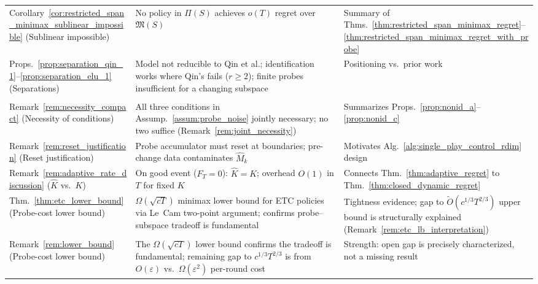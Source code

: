\documentclass{article}
\begin{document}
{\begin{longtable}{
  >{\raggedright\arraybackslash}p{}
  >{\raggedright\arraybackslash}p{}
  >{\raggedright\arraybackslash}p{}
}
Corollary~\ref{cor:restricted_span_minimax_sublinear_impossible} \newline (Sublinear impossible) &
  No policy in $\Pi(S)$ achieves $o(T)$ regret over $\mathfrak M(S)$ &
  Summary of Thms.~\ref{thm:restricted_span_minimax_regret}--\ref{thm:restricted_span_minimax_regret_with_probe} \\

Props.~\ref{prop:separation_qin_1}--\ref{prop:separation_elu_1} \newline (Separations) &
  Model not reducible to Qin et al.; identification works where Qin's fails ($r\!\ge\!2$); finite probes insufficient for a changing subspace &
  Positioning vs.\ prior work \\

\midrule
\multicolumn{3}{l}{\textit{\textbf{Key remarks} --- interpretive context}} \\
\midrule

Remark~\ref{rem:necessity_compact} \newline (Necessity of conditions) &
  All three conditions in Assump.~\ref{assum:probe_noise} jointly necessary; no two suffice (Remark~\ref{rem:joint_necessity}) &
  Summarizes Props.~\ref{prop:nonid_a}--\ref{prop:nonid_c} \\

Remark~\ref{rem:reset_justification} \newline (Reset justification) &
  Probe accumulator must reset at boundaries; pre-change data contaminates $\widehat M_k$ &
  Motivates Alg.~\ref{alg:single_play_control_rdim} design \\

Remark~\ref{rem:adaptive_rate_discussion} \newline ($\hat K$ vs.\ $K$) &
  On good event ($F_T\!=\!0$): $\hat K\!=\!K$; overhead $O(1)$ in $T$ for fixed $K$ &
  Connects Thm.~\ref{thm:adaptive_regret} to Thm.~\ref{thm:closed_dynamic_regret} \\

Thm.~\ref{thm:etc_lower_bound} \newline (Probe-cost lower bound) &
  $\Omega(\sqrt{cT})$ minimax lower bound for ETC policies via Le~Cam two-point argument; confirms probe--subspace tradeoff is fundamental &
  Tightness evidence; gap to $\widetilde O(c^{1/3}T^{2/3})$ upper bound is structurally explained (Remark~\ref{rem:etc_lb_interpretation}) \\

Remark~\ref{rem:lower_bound} \newline (Probe-cost lower bound) &
  The $\Omega(\sqrt{cT})$ lower bound confirms the tradeoff is fundamental; remaining gap to $c^{1/3}T^{2/3}$ is from $O(\varepsilon)$ vs.\ $\Omega(\varepsilon^2)$ per-round cost &
  Strength: open gap is precisely characterized, not a missing result \\

\end{longtable}
}%
\end{document}
